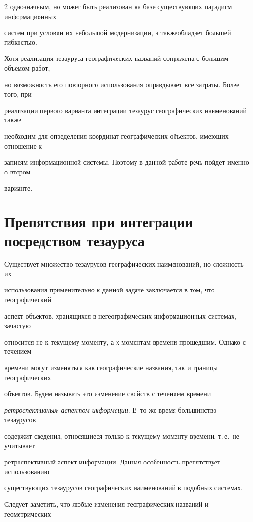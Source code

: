 \begin{multicols}{2}
однозначным, но может быть реализован на базе существующих парадигм информационных 

систем при условии их небольшой модернизации, а также\linebreak облада\-ет большей гибкостью. 

Хотя реализация тезауруса географических названий сопряжена с большим объемом работ, 

но возможность его повторного использования оправдывает все затраты. Более того, при 

реализации первого варианта интеграции тезаурус географических наименований также 

необходим для определения координат географических объектов, имеющих отношение к 

записям информационной системы. Поэтому в данной работе речь пойдет именно о втором 

варианте.

  

  \section{Препятствия при интеграции посредством тезауруса}

  

  Существует множество тезаурусов географических наименований, но сложность их 

использования применительно к данной задаче заключается в том, что географический 

аспект объектов, хранящихся в негеографических информационных системах, зачастую 

относится не к текущему моменту, а к моментам времени прошедшим. Однако с течением 

времени могут изменяться как географические названия, так и границы географических 

объектов. Будем называть это изменение свойств с течением времени 

\textit{ретроспективным аспектом информации}. В~то же время большинство тезаурусов 

содержит сведения, относящиеся только к текущему моменту времени, т.\,е.\ не учитывает 

ретроспективный аспект информации. Данная особенность препятствует использованию 

существующих тезаурусов географических наименований в подобных системах. 

  

  Следует заметить, что любые изменения географических названий и геометрических 


\end{multicols}
